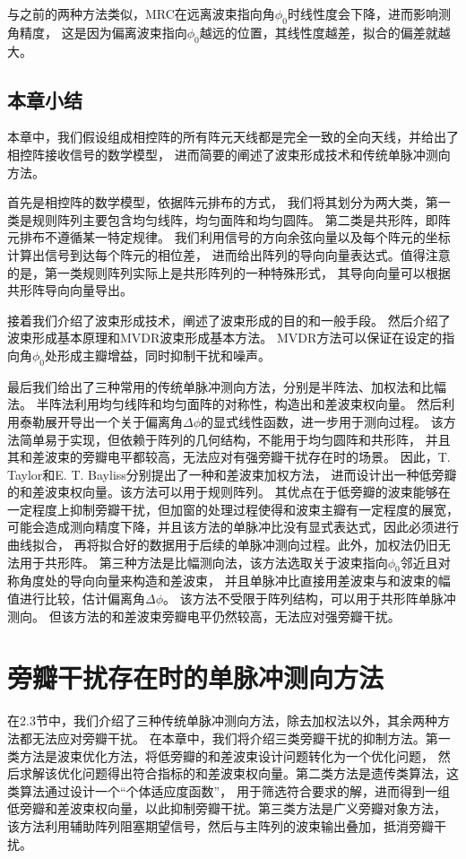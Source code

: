 \documentclass[master]{thesis-uestc}
\begin{document}
与之前的两种方法类似，MRC在远离波束指向角$\phi_0$时线性度会下降，进而影响测角精度，
这是因为偏离波束指向$\phi_0$越远的位置，其线性度越差，拟合的偏差就越大。

\section{本章小结}
本章中，我们假设组成相控阵的所有阵元天线都是完全一致的全向天线，并给出了相控阵接收信号的数学模型，
进而简要的阐述了波束形成技术和传统单脉冲测向方法。

首先是相控阵的数学模型，依据阵元排布的方式，
我们将其划分为两大类，第一类是规则阵列主要包含均匀线阵，均匀面阵和均匀圆阵。
第二类是共形阵，即阵元排布不遵循某一特定规律。
我们利用信号的方向余弦向量以及每个阵元的坐标计算出信号到达每个阵元的相位差，
进而给出阵列的导向向量表达式。值得注意的是，第一类规则阵列实际上是共形阵列的一种特殊形式，
其导向向量可以根据共形阵导向向量导出。

接着我们介绍了波束形成技术，阐述了波束形成的目的和一般手段。
然后介绍了波束形成基本原理和MVDR波束形成基本方法。
MVDR方法可以保证在设定的指向角$\phi_0$处形成主瓣增益，同时抑制干扰和噪声。

最后我们给出了三种常用的传统单脉冲测向方法，分别是半阵法、加权法和比幅法。
半阵法利用均匀线阵和均匀面阵的对称性，构造出和差波束权向量。
然后利用泰勒展开导出一个关于偏离角$\Delta\phi$的显式线性函数，进一步用于测向过程。
该方法简单易于实现，但依赖于阵列的几何结构，不能用于均匀圆阵和共形阵，
并且其和差波束的旁瓣电平都较高，无法应对有强旁瓣干扰存在时的场景。
因此，T. Taylor和E. T. Bayliss分别提出了一种和差波束加权方法，
进而设计出一种低旁瓣的和差波束权向量。该方法可以用于规则阵列。
其优点在于低旁瓣的波束能够在一定程度上抑制旁瓣干扰，但加窗的处理过程使得和波束主瓣有一定程度的展宽，
可能会造成测向精度下降，并且该方法的单脉冲比没有显式表达式，因此必须进行曲线拟合，
再将拟合好的数据用于后续的单脉冲测向过程。此外，加权法仍旧无法用于共形阵。
第三种方法是比幅测向法，该方法选取关于波束指向$\phi_0$邻近且对称角度处的导向向量来构造和差波束，
并且单脉冲比直接用差波束与和波束的幅值进行比较，估计偏离角$\Delta\phi$。
该方法不受限于阵列结构，可以用于共形阵单脉冲测向。
但该方法的和差波束旁瓣电平仍然较高，无法应对强旁瓣干扰。

\chapter{旁瓣干扰存在时的单脉冲测向方法}
在2.3节中，我们介绍了三种传统单脉冲测向方法，除去加权法以外，其余两种方法都无法应对旁瓣干扰。
在本章中，我们将介绍三类旁瓣干扰的抑制方法。第一类方法是波束优化方法，将低旁瓣的和差波束设计问题转化为一个优化问题，
然后求解该优化问题得出符合指标的和差波束权向量。第二类方法是遗传类算法，这类算法通过设计一个“个体适应度函数”，
用于筛选符合要求的解，进而得到一组低旁瓣和差波束权向量，以此抑制旁瓣干扰。第三类方法是广义旁瓣对象方法，
该方法利用辅助阵列阻塞期望信号，然后与主阵列的波束输出叠加，抵消旁瓣干扰。
\end{document}
